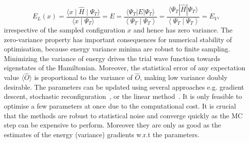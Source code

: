 \begin{equation}
	E_{L}(x)=\frac{\langle x\mid\hat{H}\mid \Psi_{T}\rangle}{\langle x \mid \Psi_{T}\rangle}=E=\frac{\langle\Psi_{T}|E| \Psi_{T}\rangle}{\left\langle\Psi_{T} \mid \Psi_{T}\right\rangle}=\frac{\langle\Psi_{T}|\hat{H}| \Psi_{T}\rangle}{\left\langle\Psi_{T} \mid \Psi_{T}\right\rangle}=E_{V},
\end{equation}
irrespective of the sampled configuration $x$ and hence has zero variance. The zero-variance property has important consequences for numerical stability of optimisation, because energy variance minima are robust to finite sampling. Minimizing the variance of energy drives the trial wave function towards eigenstates of the Hamiltonian. Moreover, the statistical error of any expectation value $\langle \hat{O} \rangle$ is proportional to the variance of $\hat{O}$, making low variance doubly desirable. The parameters can be updated using several approaches e.g. gradient descent, stochastic reconfiguration~\cite{sorella1998green}, or the linear method~\cite{nightingale2001optimization}. It is only feasible to optimise a few parameters at once due to the computational cost. It is crucial that the methods are robust to statistical noise and converge quickly as the MC step can be expensive to perform. Moreover they are only as good as the estimates of the energy (variance) gradients w.r.t the parameters.

